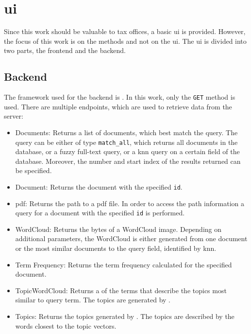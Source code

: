 \section{\acl{ui}}\label{sec:ui}

Since this work should be valuable to tax offices, a basic \ac{ui} is provided.
However, the focus of this work is on the methods and not on the \ac{ui}.
The \ac{ui} is divided into two parts, the frontend and the backend.

\subsection{Backend}\label{subsec:backend}

The framework used for the backend is \flask{}.
In this work, only the \texttt{GET} method is used.
There are multiple endpoints, which are used to retrieve data from the server:

\begin{itemize}
    \item \label{pt:docs}Documents: 
        Returns a list of documents, which best match the query.
        The query can be either of type \texttt{match\_all}, which returns all documents in the database, 
        or a fuzzy full-text query, 
        or a \ac{knn} query on a certain field of the database.
        Moreover, the number and start index of the results returned can be specified.

    \item \label{pt:doc}Document: 
        Returns the document with the specified \texttt{id}.

    \item \label{pt:pdf}\ac{pdf}: 
        Returns the path to a \ac{pdf} file.
        In order to access the path information a query for a document with the specified \texttt{id} is performed.
    
    \item \label{pt:wordcloud}WordCloud: 
        Returns the bytes of a WordCloud image. 
        Depending on additional parameters, the WordCloud is either generated from one document or 
        the most similar documents to the query field, identified by \ac{knn}.

    \item \label{pt:termfrequency}Term Frequency:
        Returns the term frequency calculated for the specified document.

    \item \label{pt:topic_wordcloud}TopicWordCloud:
        Returns a \wordcloud{} of the terms that describe the topics most similar to query term.
        The topics are generated by \topTwovec{}.

    \item \label{pt:topic}Topics: 
        Returns the topics generated by \topTwovec{}. 
        The topics are described by the words closest to the topic vectors.
\end{itemize}

